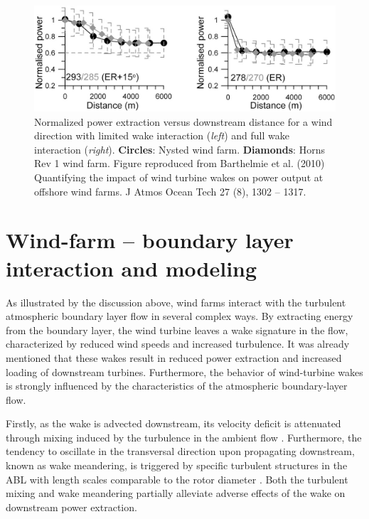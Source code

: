 \begin{figure}[t]
	\centering
	\includegraphics[width=\textwidth]{chapters/introduction/power_barthelmie.eps}
	\caption[Normalized power extraction versus downstream distance for a wind direction with limited wake interaction and full wake interaction.]{Normalized power extraction versus downstream distance for a wind direction with limited wake interaction (\emph{left}) and full wake interaction (\emph{right}). \textbf{Circles}: Nysted wind farm. {\color{gray} \textbf{Diamonds}}: Horns Rev 1 wind farm. Figure reproduced from Barthelmie et al. (2010) Quantifying the impact of wind turbine wakes on power output at offshore wind farms. J Atmos Ocean Tech 27 (8), 1302 -- 1317. \label{fig:power_deficiency}}
\end{figure}

\section{Wind-farm -- boundary layer interaction and modeling}\label{sec:intro_wfbl}
As illustrated by the discussion above, wind farms interact with the turbulent atmospheric boundary layer flow in several complex ways. By extracting energy from the boundary layer, the wind turbine leaves a wake signature in the flow, characterized by reduced wind speeds and increased turbulence. It was already mentioned that these wakes result in reduced power extraction and increased loading of downstream turbines. Furthermore, the behavior of wind-turbine wakes is strongly influenced by the characteristics of the atmospheric boundary-layer flow. 

Firstly, as the wake is advected downstream, its velocity deficit is attenuated through mixing induced by the turbulence in the ambient flow \citep{Chamorro2009}. Furthermore, the tendency to oscillate in the transversal direction upon propagating downstream, known as wake meandering, is triggered by specific turbulent structures in the ABL with length scales comparable to the rotor diameter \citep{espana2011spatial,espanawind}. Both the turbulent mixing and wake meandering partially alleviate adverse effects of the wake on downstream power extraction. 

